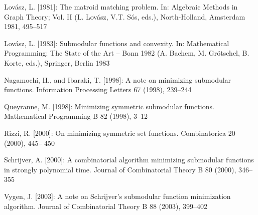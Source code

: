 {Lovász, L. [1981]: The matroid matching problem. In: Algebraic Methods in Graph Theory; Vol. II (L. Lovász, V.T. Sós, eds.), North-Holland, Amsterdam 1981, 495–517\par
Lovász, L. [1983]: Submodular functions and convexity. In: Mathematical Programming: The State of the Art – Bonn 1982 (A. Bachem, M. Grötschel, B. Korte, eds.), Springer, Berlin 1983\par
Nagamochi, H., and Ibaraki, T. [1998]: A note on minimizing submodular functions. Information Processing Letters 67 (1998), 239–244\par
Queyranne, M. [1998]: Minimizing symmetric submodular functions. Mathematical Programming B 82 (1998), 3–12\par
Rizzi, R. [2000]: On minimizing symmetric set functions. Combinatorica 20 (2000), 445– 450\par
Schrijver, A. [2000]: A combinatorial algorithm minimizing submodular functions in strongly polynomial time. Journal of Combinatorial Theory B 80 (2000), 346–355\par
Vygen, J. [2003]: A note on Schrijver’s submodular function minimization algorithm. Journal of Combinatorial Theory B 88 (2003), 399–402\par
}
